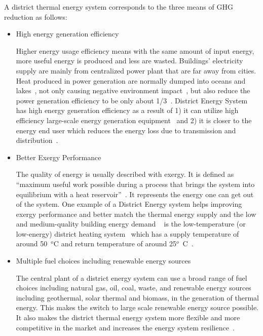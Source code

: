 A district thermal energy system corresponds to the three means of GHG
reduction as follows:
\begin{itemize}
\item High energy generation efficiency

  Higher energy usage efficiency means with the same amount of input
  energy, more useful energy is produced and less are
  wasted. Buildings' electricity supply are mainly from centralized
  power plant that are far away from cities. Heat produced in power
  generation are normally dumped into oceans and
  lakes~\cite{baird2014, IDEA2012}, not only causing negative
  environment impact~\cite{wasteHeatEnviron}, but also reduce the
  power generation efficiency to be only about
  1/3~\cite{IDEA2012}. District Energy System has high energy
  generation efficiency as a result of 1) it can utilize high
  efficiency large-scale energy generation equipment~\cite{IDEA2005}
  and 2) it is closer to the energy end user which reduces the energy
  loss due to transmission and distribution~\cite{IDEA2012}.

\item Better Exergy Performance 

  The quality of energy is usually described with exergy. It is
  defined as ``maximum useful work possible during a process that
  brings the system into equilibrium with a heat
  reservoir''~\cite{exergyWiki2015}. It represents the energy one can
  get out of the system. One example of a District Energy system helps
  improving exergy performance and better match the thermal energy
  supply and the low and medium-quality building energy demand
  ~\cite{Dobbelsteen2013} is the low-temperature (or low-energy)
  district heating system~\cite{Tol2012551} which has a supply
  temperature of around 50~$^o$C and return temperature of around
  25$^o$~C~\cite{Tol2012551}.

\item Multiple fuel choices including renewable energy sources

  The central plant of a district energy system can use a broad range
  of fuel choices including natural gas, oil, coal, waste, and
  renewable energy sources including geothermal, solar thermal and
  biomass, in the generation of thermal energy. This makes the switch
  to large scale renewable energy source possible. It also makes the
  district thermal energy system more flexible and more competitive in
  the market and increases the energy system
  resilience~\cite{IDEA2005, IDEA2012}.

\end{itemize}

